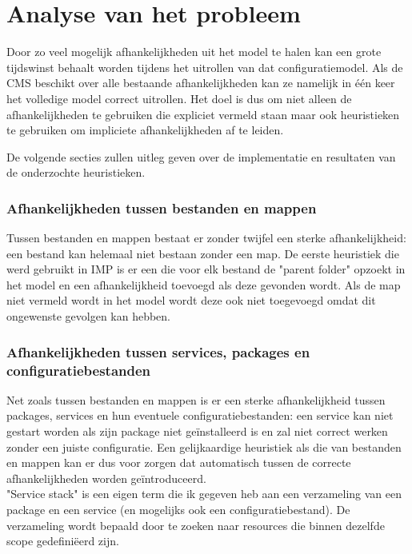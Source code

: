 \chapter{Analyse van het probleem}
\label{chapter:analyse}
Door zo veel mogelijk afhankelijkheden uit het model te halen kan een grote  tijdswinst behaalt worden
tijdens het uitrollen van dat configuratiemodel.
Als de CMS beschikt over alle bestaande afhankelijkheden kan ze namelijk in \'e\'en keer het volledige model correct uitrollen.
Het doel is dus om niet alleen de afhankelijkheden te gebruiken die expliciet vermeld staan maar ook heuristieken te gebruiken om
impliciete afhankelijkheden af te leiden.

De volgende secties zullen uitleg geven over de implementatie en resultaten van de onderzochte heuristieken.

\subsection{Afhankelijkheden tussen bestanden en mappen}
\label{subs:bestanden_en_mappen}
Tussen bestanden en mappen bestaat er zonder twijfel een sterke afhankelijkheid: een bestand kan helemaal niet bestaan zonder een map.
De eerste heuristiek die werd gebruikt in IMP is er een die voor elk bestand de "parent folder" opzoekt in het model en een afhankelijkheid toevoegd als deze gevonden wordt.
Als de map niet vermeld wordt in het model wordt deze ook niet toegevoegd omdat dit ongewenste gevolgen kan hebben. 

\subsection{Afhankelijkheden tussen services, packages en configuratiebestanden}
\label{subs:services_packages_en_configuratiebestanden}
Net zoals tussen bestanden en mappen is er een sterke afhankelijkheid tussen packages, services en hun eventuele configuratiebestanden:
een service kan niet gestart worden als zijn package niet ge\"installeerd is en zal niet correct werken zonder een juiste configuratie.
Een gelijkaardige heuristiek als die van bestanden en mappen kan er dus voor zorgen dat automatisch tussen de correcte afhankelijkheden worden ge\"introduceerd.
\\
"Service stack" is een eigen term die ik gegeven heb aan een verzameling van een package en een service (en mogelijks ook een configuratiebestand).
De verzameling wordt bepaald door te zoeken naar resources die binnen dezelfde scope gedefini\"eerd zijn.

